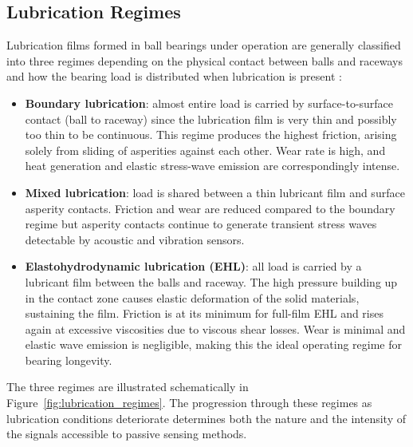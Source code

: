 \subsection{Lubrication Regimes}
\label{subsec:lubrication_regimes}
Lubrication films formed in ball bearings under operation are generally classified into three regimes depending on the physical contact between balls and raceways and how the bearing load is distributed when lubrication is present \cite{stachowiak_engineering_2014}:
\begin{itemize}
    \item \textbf{Boundary lubrication}: almost entire load is carried by surface-to-surface contact (ball to raceway) since the lubrication film is very thin and possibly too thin to be continuous. This regime produces the highest friction, arising solely from sliding of asperities against each other. Wear rate is high, and heat generation and elastic stress-wave emission are correspondingly intense.
    \item \textbf{Mixed lubrication}: load is shared between a thin lubricant film and surface asperity contacts. Friction and wear are reduced compared to the boundary regime but asperity contacts continue to generate transient stress waves detectable by acoustic and vibration sensors.
    \item \textbf{Elastohydrodynamic lubrication (EHL)}: all load is carried by a lubricant film between the balls and raceway. The high pressure building up in the contact zone causes elastic deformation of the solid materials, sustaining the film. Friction is at its minimum for full-film EHL and rises again at excessive viscosities due to viscous shear losses. Wear is minimal and elastic wave emission is negligible, making this the ideal operating regime for bearing longevity.
\end{itemize}
The three regimes are illustrated schematically in Figure~\ref{fig:lubrication_regimes}. The progression through these regimes as lubrication conditions deteriorate determines both the nature and the intensity of the signals accessible to passive sensing methods.

